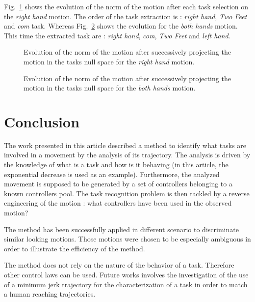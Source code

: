 \documentclass[letterpaper, 10pt, conference]{ieeeconf}      %
\begin{document}
Fig.~\ref{fig:exp1:PqdotNormsR} shows the evolution of the norm of the motion after each task selection
on the \emph{right hand} motion. The order of the task extraction is :
\emph{right hand}, \emph{Two Feet} and \emph{com} task.
Whereas Fig.~\ref{fig:exp1:PqdotNormsRL} shows the evolution for the \emph{both hands} motion.
This time the extracted task are : \emph{right hand},  \emph{com}, \emph{Two Feet} and \emph{left hand}.

\begin{figure}[t]
  \resizebox{.48\textwidth}{!} {
    
  }
\caption{Evolution of the norm of the motion after successively projecting the motion in the tasks null space for
the \emph{right hand} motion.}
\label{fig:exp1:PqdotNormsR}
\end{figure}

\begin{figure}[t]
  \resizebox{.48\textwidth}{!} {
    
  }
\caption{Evolution of the norm of the motion after successively projecting the motion in the tasks null space for
the \emph{both hands} motion.}
\label{fig:exp1:PqdotNormsRL}
\end{figure}

\section{Conclusion}
The work presented in this article described a method to identify what tasks are involved in a movement
by the analysis of its trajectory. 
The analysis is driven by the knowledge
of what is a task and how is it behaving (in this article, the exponential decrease is used as an example). 
Furthermore, the analyzed movement is supposed to be generated by a set of 
controllers belonging to a known controllers pool. 
The task recognition problem is then tackled by a reverse engineering of the motion :
what controllers have been used in the observed motion?

The method has been successfully applied in different
scenario to discriminate similar looking motions. Those motions were chosen to be especially
ambiguous in order to illustrate the efficiency of the method.

The method does not rely on the nature of the behavior of a task. Therefore
other control laws can be used. Future works involves the investigation of the use of 
a minimum jerk trajectory for the characterization of a task in order to match
a human reaching trajectories. 



\end{document}
